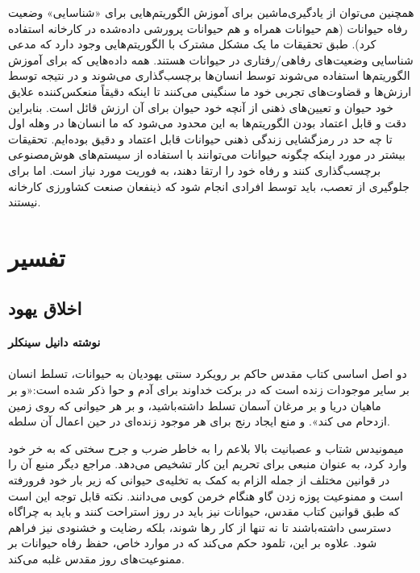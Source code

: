 همچنین می‌توان از یادگیری‌ماشین برای آموزش الگوریتم‌هایی برای «شناسایی» وضعیت رفاه حیوانات (هم حیوانات همراه و هم حیوانات پرورشی داده‌شده در کارخانه استفاده کرد).
طبق تحقیقات ما یک مشکل مشترک با الگوریتم‌هایی وجود دارد که مدعی شناسایی وضعیت‌های رفاهی/رفتاری در حیوانات هستند.
همه داده‌هایی که برای آموزش الگوریتم‌ها استفاده می‌شوند توسط انسان‌ها برچسب‌گذاری می‌شوند و در نتیجه توسط ارزش‌ها و قضاوت‌های تجربی خود ما سنگینی می‌کنند تا اینکه دقیقاً منعکس‌کننده علایق خود حیوان و تعیین‌های ذهنی از آنچه خود حیوان برای آن ارزش قائل است.
بنابراین دقت و قابل اعتماد بودن الگوریتم‌ها به این محدود می‌شود که ما انسان‌ها در وهله اول تا چه حد در رمزگشایی زندگی ذهنی حیوانات قابل اعتماد و دقیق بوده‌ایم.
تحقیقات بیشتر در مورد اینکه چگونه حیوانات می‌توانند با استفاده از سیستم‌های هوش‌مصنوعی برچسب‌گذاری کنند و رفاه خود را ارتقا دهند، به فوریت مورد نیاز است.
اما برای جلوگیری از تعصب، باید توسط افرادی انجام شود که ذینفعان صنعت کشاورزی کارخانه نیستند.
\newline
\newline



{
\section*{تفسیر}
\label{sec:تفسیر}


\subsection*{اخلاق یهود}
\label{subsec:اخلاق یهود}
\noindent \textbf{نوشته دانیل سینکلر}
\\\\
دو اصل اساسی کتاب مقدس حاکم بر رویکرد سنتی یهودیان به حیوانات، تسلط انسان بر سایر موجودات زنده است که در برکت خداوند برای آدم و حوا ذکر شده است:«و بر ماهیان دریا و بر مرغان آسمان تسلط داشته‌باشید، و بر هر حیوانی که روی زمین ازدحام می کند».
و منع ایجاد رنج برای هر موجود زنده‌ای در حین اعمال آن سلطه.
}

میمونیدس شتاب و عصبانیت بالا بلاعم را به خاطر ضرب و جرح سختی که به خر خود وارد کرد، به عنوان منبعی برای تحریم این کار تشخیص می‌دهد.
مراجع دیگر منبع آن را در قوانین مختلف از جمله الزام به کمک به تخلیه‌ی حیوانی که زیر بار خود فرورفته است و ممنوعیت پوزه زدن گاو هنگام خرمن کوبی می‌دانند.
نکته قابل توجه این است که طبق قوانین کتاب مقدس، حیوانات نیز باید در روز استراحت کنند و باید به چراگاه دسترسی داشته‌باشند تا نه تنها از کار رها شوند، بلکه رضایت و خشنودی نیز فراهم شود.
علاوه بر این، تلمود حکم می‌کند که در موارد خاص، حفظ رفاه حیوانات بر ممنوعیت‌های روز مقدس غلبه می‌کند.

